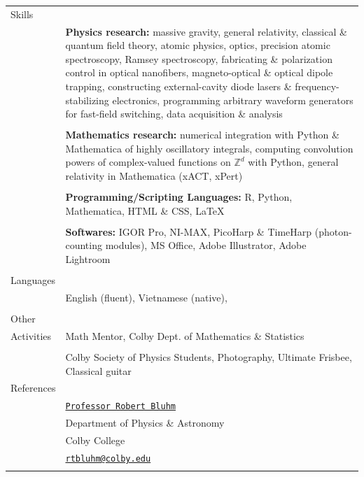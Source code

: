 \documentclass[10pt]{article}
\begin{document}
\begin{longtable}{ l m{14.5cm}   }
  						 
  						 
  \large{Skills}      	& \\ 
  						& \textbf{Physics research:} massive gravity,  general relativity, classical \& quantum field theory, atomic physics, optics, precision atomic spectroscopy, Ramsey spectroscopy, fabricating \& polarization control in optical nanofibers, magneto-optical \& optical dipole trapping, constructing external-cavity diode lasers \& frequency-stabilizing electronics, programming arbitrary waveform generators for fast-field switching, data acquisition \& analysis \\
  						& \\
  						& \textbf{Mathematics research:} numerical integration with Python \& Mathematica of highly oscillatory integrals, computing convolution powers of complex-valued functions on $\mathbb{Z}^d$ with Python, general relativity in Mathematica (xACT, xPert)  \\
  						& \\
  						& \textbf{Programming/Scripting Languages:} R, Python, Mathematica, HTML \& CSS, \LaTeX{}\\
  						& \\
  						& \textbf{Softwares:} IGOR Pro,  NI-MAX, PicoHarp \& TimeHarp (photon-counting modules), MS Office,  Adobe Illustrator, Adobe Lightroom\\ 
  						& \\
  						 
  				

  \large{Languages}     & \\
  						& English (fluent), Vietnamese (native), \\
						& \\
  						 
  \large{Other}    & \\ 
  \large{Activities}		& Math Mentor, Colby Dept. of Mathematics \& Statistics \\
  						& \\
  						& Colby Society of Physics Students, Photography, Ultimate Frisbee, Classical guitar \\
  						
  						
  						


     		

  \large{References}	& \\
  						& \href{http://www.colby.edu/physics/faculty/robert.html}{\texttt{Professor Robert Bluhm}} \\
  						& Department of Physics \& Astronomy \\
  						& Colby College \\
  						& {\href{mailto:rtbluhm@colby.edu}{\texttt{rtbluhm@colby.edu}}} \\
  						&  \\
  						

\end{longtable}
\end{document}
